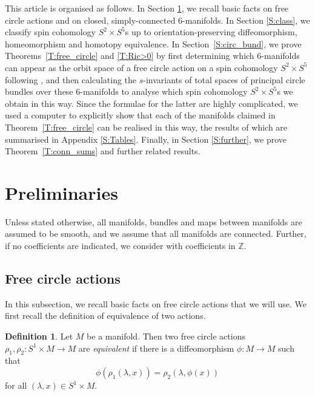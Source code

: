 \documentclass[10pt,a4paper]{amsart}
\numberwithin{equation}{section}
\theoremstyle{definition}
\newtheorem{Definition}[Theorem]{Definition}
\numberwithin{table}{section}
\newcommand{\Z}{\mathbb{Z}}
\begin{document}
This article is organised as follows. In Section \ref{S:prel}, we recall basic facts on free circle actions and on closed, simply-connected 6-manifolds. In Section \ref{S:class}, we classify spin cohomology $S^2\times S^5$s up to orientation-preserving diffeomorphism, homeomorphism and homotopy equivalence. In Section~\ref{S:circ_bund}, we prove Theorems~\ref{T:free_circle} and \ref{T:Ric>0} by first determining which $6$-manifolds can appear as the orbit space of a free circle action on a spin cohomology $S^2\times S^5$ following \cite{Xu25}, and then calculating the $s$-invariants of total spaces of principal circle bundles over these $6$-manifolds to analyse which spin cohomology $S^2\times S^5$s we obtain in this way. Since the formulae for the latter are highly complicated, we used a computer to explicitly show that each of the manifolds claimed in Theorem~\ref{T:free_circle} can be realised in this way, the results of which are summarised in Appendix \ref{S:Tables}. Finally, in Section \ref{S:further}, we prove Theorem~\ref{T:conn_sums} and further related results.




\section{Preliminaries}\label{S:prel}

Unless stated otherwise, all manifolds, bundles and maps between manifolds are assumed to be smooth, and we assume that all manifolds are connected. Further, if no coefficients are indicated, we consider  with coefficients in $\Z$.

\subsection{Free circle actions}

In this subsection, we recall basic facts on free circle actions that we will use. We first recall the definition of equivalence of two actions.

\begin{Definition}
	Let $M$ be a manifold. Then two free circle actions $\rho_1,\rho_2\colon S^1\times M\to M$ are \emph{equivalent} if there is a diffeomorphism $\phi\colon M\to M$ such that
	\[ \phi(\rho_1(\lambda,x))=\rho_2(\lambda,\phi(x)) \]
	for all $(\lambda,x)\in S^1\times M$.
\end{Definition}
\end{document}
